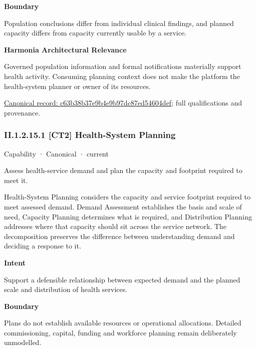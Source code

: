 \textbf{Boundary}



Population conclusions differ from individual clinical findings, and planned capacity differs from capacity currently usable by a service.



\textbf{Harmonia Architectural Relevance}



Governed population information and formal notifications materially support health activity. Consuming planning context does not make the platform the health-system planner or owner of its resources.


{\footnotesize \href{../../../../continuum/strategy/capability/c63b38b37e9b4e9b97dc87ed54604def.md}{Canonical record: c63b38b37e9b4e9b97dc87ed54604def}; full qualifications and provenance.}\par
\subsubsection*{II.1.2.15.1 [CT2] Health-System Planning}
\label{navigation:II.1.2.15.1}

\label{element:9ca4df07eceb4150a0190cc488270ce2}
{\small Capability · Canonical · current}\par

Assess health-service demand and plan the capacity and footprint required to meet it.



Health-System Planning considers the capacity and service footprint required to meet assessed demand. Demand Assessment establishes the basis and scale of need, Capacity Planning determines what is required, and Distribution Planning addresses where that capacity should sit across the service network. The decomposition preserves the difference between understanding demand and deciding a response to it.



\textbf{Intent}



Support a defensible relationship between expected demand and the planned scale and distribution of health services.



\textbf{Boundary}



Plans do not establish available resources or operational allocations. Detailed commissioning, capital, funding and workforce planning remain deliberately unmodelled.


